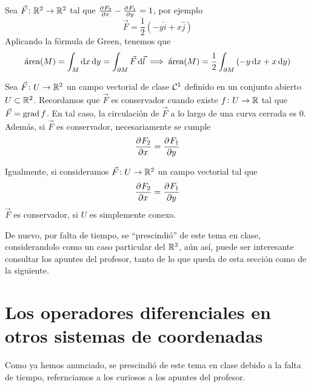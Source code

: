 \begin{example}
    Sea $\vec{F} \colon \mathbb{R}^2 \to \mathbb{R}^2$ tal que $\frac{\partial^{} F_2}{\partial x^{}} - \frac{\partial^{} F_1}{\partial y^{}} = 1$, por ejemplo
    \[
        \vec{F} = \frac{1}{2} \left( -y \hat{i} + x \hat{j} \right)
    \]
    Aplicando la fórmula de Green, tenemos que
    \[
        \text{área}(M) = \int_M \dif x \dif y = \int_{\partial M} \vec{F} \dif \vec{l} \implies
        \text{área}(M) = \frac{1}{2} \int_{\partial M} \left( -y \dif x + x \dif y \right)
    \]
\end{example}

\begin{prop}
    Sea $\vec{F} \colon U \to \mathbb{R}^2$ un campo vectorial de clase $\mathcal{C}^1$ definido en un conjunto abierto $U \subset \mathbb{R}^2$.
    Recordamos que $\vec{F}$ es conservador cuando existe $f \colon U \to \mathbb{R}$ tal que $\vec{F} = \operatorname{grad} f$. En tal caso, la
    circulación de $\vec{F}$ a lo largo de una curva cerrada es 0. Además, si $\vec{F}$ es conservador, necesariamente se cumple
    \[
        \frac{\partial^{} F_2}{\partial x^{}} = \frac{\partial^{} F_1}{\partial y^{}}
    \]
\end{prop}

\begin{prop}
    Igualmente, si consideramos $\vec{F} \colon U \to \mathbb{R}^2$ un campo vectorial tal que
    \[
        \frac{\partial^{} F_2}{\partial x^{}} = \frac{\partial^{} F_1}{\partial y^{}}
    \]
    $\vec{F}$ es conservador, si $U$ es simplemente conexo.
\end{prop}


De nuevo, por falta de tiempo, se ``prescindió'' de este tema en clase, considerandolo como un caso particular del $\mathbb{R}^3$, aún
así, puede ser interesante consultar los apuntes del profesor, tanto de lo que queda de esta sección como de la siguiente.

\section{Los operadores diferenciales en otros sistemas de coordenadas}

Como ya hemos anunciado, se prescindió de este tema en clase debido a la falta de tiempo, refernciamos a los curiosos a los apuntes del
profesor.
